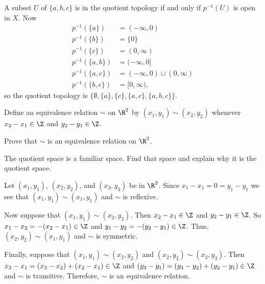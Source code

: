 
\ExerciseSolution A subset $U$ of $\{a,b,c\}$ is in the quotient topology if and only if $p^{-1}(U)$ is open in $X$. Now 
\begin{align*}
p^{-1}(\{a\}) &= (-\infty, 0) \\
p^{-1}(\{b\}) &= \{0\} \\
p^{-1}(\{c\}) &= (0, \infty) \\
p^{-1}(\{a,b\}) &= (-\infty, 0] \\
p^{-1}(\{a,c\}) &= (-\infty, 0) \cup (0, \infty) \\
p^{-1}(\{b,c\}) &= [0,\infty),
\end{align*}
so the quotient topology is $\{\emptyset, \{a\}, \{c\}, \{a,c\}, \{a,b,c\}\}$.  


\item Define an equivalence relation $\sim$ on $\R^2$ by $(x_1,y_1) \sim (x_2,y_2)$ whenever $x_2 - x_1 \in \Z$ and $y_2 - y_1 \in \Z$. 

\ba

\item Prove that $\sim$ is an equivalence relation on $\R^2$.

\item The quotient space is a familiar space. Find that space and explain why it is the quotient space.

\ea


\ExerciseSolution 

\ba

\item Let $(x_1,y_1)$, $(x_2, y_2)$, and $(x_3,y_3)$ be in $\R^2$. Since $x_1 - x_1 = 0 = y_1 - y_1$ we see that $(x_1,y_1) \sim (x_1, y_1)$ and $\sim$ is reflexive.

Now suppose that $(x_1,y_1) \sim (x_2,y_2)$. Then $x_2 - x_1 \in \Z$ and $y_2 - y_1 \in \Z$. So $x_1 - x_2 = -(x_2-x_1) \in \Z$ and $y_1-y_2 = -(y_2 - y_1) \in \Z$. Thus, $(x_2, y_2) \sim (x_1,y_1)$ and $\sim$ is symmetric.

Finally, suppose that $(x_1,y_1) \sim (x_2,y_2)$ and $(x_2,y_2) \sim (x_3,y_3)$. Then $x_3-x_1 = (x_3-x_2) + (x_2-x_1) \in \Z$ and $(y_3-y_1) = (y_3-y_2) + (y_2-y_1) \in \Z$ and $\sim$ is transitive. Therefore, $\sim$ is an equivalence relation. 

